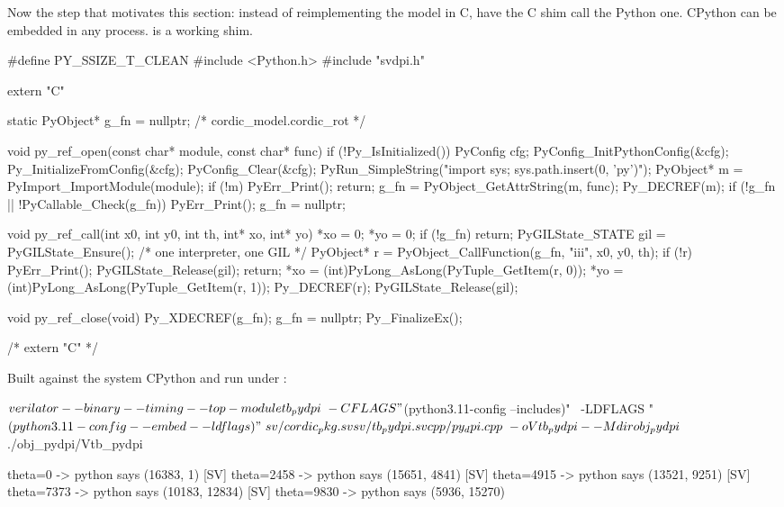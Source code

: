 Now the step that motivates this section: instead of reimplementing the model
in C, have the C shim call the Python one. CPython can be embedded in any
process.  is a working shim.

\begin{cppcode}[caption={A DPI shim with CPython embedded
(\file{py\_dpi.cpp}).},label={lst:python:pydpi}]
#define PY_SSIZE_T_CLEAN
#include <Python.h>
#include "svdpi.h"

extern "C" {

static PyObject* g_fn = nullptr;   /* cordic_model.cordic_rot */

void py_ref_open(const char* module, const char* func) {
  if (!Py_IsInitialized()) {
    PyConfig cfg;
    PyConfig_InitPythonConfig(&cfg);
    Py_InitializeFromConfig(&cfg);
    PyConfig_Clear(&cfg);
    PyRun_SimpleString("import sys; sys.path.insert(0, 'py')");
  }
  PyObject* m = PyImport_ImportModule(module);
  if (!m) { PyErr_Print(); return; }
  g_fn = PyObject_GetAttrString(m, func);
  Py_DECREF(m);
  if (!g_fn || !PyCallable_Check(g_fn)) { PyErr_Print(); g_fn = nullptr; }
}

void py_ref_call(int x0, int y0, int th, int* xo, int* yo) {
  *xo = 0; *yo = 0;
  if (!g_fn) return;
  PyGILState_STATE gil = PyGILState_Ensure();   /* one interpreter, one GIL */
  PyObject* r = PyObject_CallFunction(g_fn, "iii", x0, y0, th);
  if (!r) { PyErr_Print(); PyGILState_Release(gil); return; }
  *xo = (int)PyLong_AsLong(PyTuple_GetItem(r, 0));
  *yo = (int)PyLong_AsLong(PyTuple_GetItem(r, 1));
  Py_DECREF(r);
  PyGILState_Release(gil);
}

void py_ref_close(void) { Py_XDECREF(g_fn); g_fn = nullptr; Py_FinalizeEx(); }

}  /* extern "C" */
\end{cppcode}

Built against the system CPython and run under :

\begin{shcode}
$ verilator --binary --timing --top-module tb_pydpi \
      -CFLAGS "$(python3.11-config --includes)" \
      -LDFLAGS "$(python3.11-config --embed --ldflags)" \
      sv/cordic_pkg.sv sv/tb_pydpi.sv cpp/py_dpi.cpp \
      -o Vtb_pydpi --Mdir obj_pydpi
$ ./obj_pydpi/Vtb_pydpi
\end{shcode}

\begin{txtcode}
[SV] theta=0 -> python says (16383, 1)
[SV] theta=2458 -> python says (15651, 4841)
[SV] theta=4915 -> python says (13521, 9251)
[SV] theta=7373 -> python says (10183, 12834)
[SV] theta=9830 -> python says (5936, 15270)
\end{txtcode}

